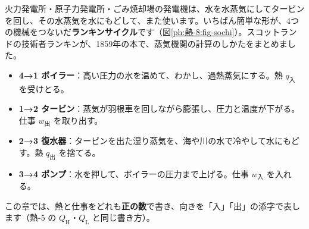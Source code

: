 
\leavevmode\label{ph:熱-8:sec6}火力発電所・原子力発電所・ごみ焼却場の発電機は、水を水蒸気にしてタービンを回し、その水蒸気を水にもどして、また使います。いちばん簡単な形が、4つの機械をつないだ\textbf{ランキンサイクル}です（図\ref{ph:熱-8:fig-sochi}）。スコットランドの技術者ランキンが、1859年の本で、蒸気機関の計算のしかたをまとめました。
\begin{itemize}[label={\color{bkTheme}●}, leftmargin=1.6\zw, itemsep=2pt, topsep=2pt]
\item \textbf{4→1 ボイラー}：高い圧力の水を温めて、わかし、過熱蒸気にする。熱 $q_{\text{入}}$ を受けとる。
\item \textbf{1→2 タービン}：蒸気が羽根車を回しながら膨張し、圧力と温度が下がる。仕事 $w_{\text{出}}$ を取り出す。
\item \textbf{2→3 復水器}：タービンを出た湿り蒸気を、海や川の水で冷やして水にもどす。熱 $q_{\text{出}}$ を捨てる。
\item \textbf{3→4 ポンプ}：水を押して、ボイラーの圧力まで上げる。仕事 $w_{\text{入}}$ を入れる。
\end{itemize}
この章では、熱と仕事をどれも\textbf{正の数}で書き、向きを「入」「出」の添字で表します（熱-5 の $Q_{\mathrm H}$・$Q_{\mathrm L}$ と同じ書き方）。
\begin{bkfigure}
\qxirankine
{}
\label{ph:熱-8:fig-sochi}
\end{bkfigure}

